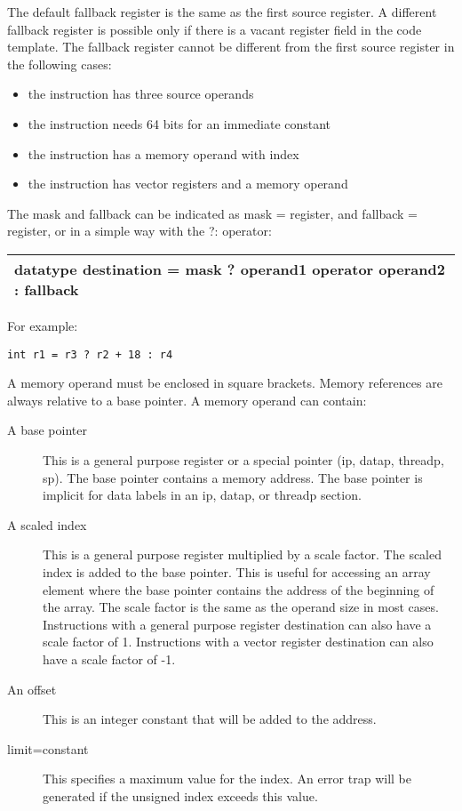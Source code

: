 \documentclass[forwardcom.tex]{subfiles}
\begin{document}
The default fallback register is the same as the first source register. A different fallback register is  possible only if there is a vacant register field in the code template. 
The fallback register cannot be different from the first source register in the following cases:
\begin{itemize}
\item the instruction has three source operands
\item the instruction needs 64 bits for an immediate constant
\item the instruction has a memory operand with index
\item the instruction has vector registers and a memory operand
\end{itemize}
\vv


The mask and fallback can be indicated as mask = register, and fallback = register, 
or in a simple way with the ?: operator:
\vv

\begin{tabular}{|p{140mm}|}
\hline
\hspace{4mm} datatype destination = mask ? operand1 operator operand2 : fallback\\
\hline
\end{tabular}
\vspace{4mm}

For example:
\begin{lstlisting}[frame=single]
int r1 = r3 ? r2 + 18 : r4
\end{lstlisting}
\vv

A memory operand must be enclosed in square brackets. Memory references are always relative to a base pointer. 
A memory operand can contain:
\vv

\begin{description}

\item[A base pointer]
This is a general purpose register or a special pointer (ip, datap, threadp, sp). The base pointer contains a memory address. 
The base pointer is implicit for data labels in an ip, datap, or threadp section.

\item[A scaled index]
This is a general purpose register multiplied by a scale factor. 
The scaled index is added to the base pointer. This is useful for accessing an array element where the base pointer contains the address of the beginning of the array. 
The scale factor is the same as the operand size in most cases. Instructions with a general purpose register destination can also have a scale factor of 1. Instructions with a vector register destination can also have a scale factor of -1.

\item[An offset]
This is an integer constant that will be added to the address.

\item[limit=constant]
This specifies a maximum value for the index. An error trap will be generated if the unsigned index exceeds this value.

\end{description}
\end{document}
